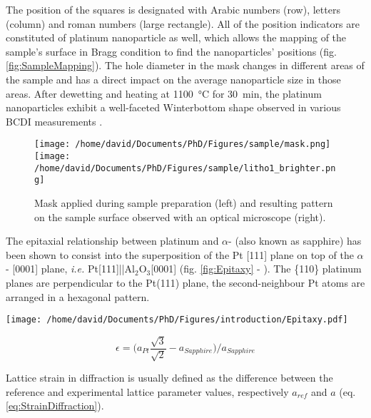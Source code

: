 The position of the squares is designated with Arabic numbers (row), letters (column) and roman numbers (large rectangle).
All of the position indicators are constituted of platinum nanoparticle as well, which allows the mapping of the sample's surface in Bragg condition to find the nanoparticles' positions (fig. \ref{fig:SampleMapping}).
The hole diameter in the mask changes in different areas of the sample and has a direct impact on the average nanoparticle size in those areas.
After dewetting and heating at \qty{1100}{\degreeCelsius} for \qty{30}{\minute}, the platinum nanoparticles exhibit a well-faceted Winterbottom shape observed in various BCDI measurements \parencite{Dupraz2017}.

\begin{figure}[!htb]
    \centering
    \texttt{[image: /home/david/Documents/PhD/Figures/sample/mask.png]}
    \texttt{[image: /home/david/Documents/PhD/Figures/sample/litho1\_brighter.png]}
    \caption{
        Mask applied during sample preparation (left) and resulting pattern on the sample surface observed with an optical microscope (right).
    }
    \label{fig:Mask}
\end{figure}

The epitaxial relationship between platinum and $\alpha$- (also known as sapphire) has been shown to consist into the superposition of the Pt [111] plane on top of the $\alpha$- [0001] plane, \textit{i.e.} Pt[111]||Al$_2$O$_3$[0001] (fig. \ref{fig:Epitaxy} - \cite{Farrow1993}).
The \{110\} platinum planes are perpendicular to the Pt(111) plane, the second-neighbour Pt atoms are arranged in a hexagonal pattern.

\begin{minipage}{0.55\linewidth}
    \centering
    \texttt{[image: /home/david/Documents/PhD/Figures/introduction/Epitaxy.pdf]}
    \label{fig:Epitaxy}
\end{minipage}%
\hfill%
\begin{minipage}{0.44\linewidth}
    \begin{equation}
        \epsilon = \big( a_{Pt} \frac{\sqrt{3}}{\sqrt{2}} - a_{Sapphire} \big) / a_{Sapphire}
        \label{eq:MisfitStrain}
    \end{equation}
\end{minipage}%

Lattice strain in diffraction is usually defined as the difference between the reference and experimental lattice parameter values, respectively $a_{ref}$ and $a$ (eq. \ref{eq:StrainDiffraction}).

